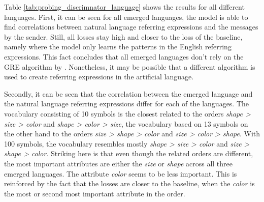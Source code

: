 Table \ref{tab:probing_discrimnator_language} shows the results for all different languages.
First, it can be seen for all emerged languages, the model is able to find correlations between natural language referring expressions and the messages by the sender.
Still, all losses stay high and closer to the loss of the baseline, namely where the model only learns the patterns in the English referring expressions.
This fact concludes that all emerged languages don't rely on the GRE algorithm by \citet{Dale1995}.
Nonetheless, it may be possible that a different algorithm is used to create referring expressions in the artificial language.

Secondly, it can be seen that the correlation between the emerged language and the natural language referring expressions differ for each of the languages.
The vocabulary consisting of 10 symbols is the closest related to the orders \emph{shape > size > color} and \emph{shape > color > size}, the vocabulary based on 13 symbols on the other hand to the orders \emph{size > shape > color} and \emph{size > color > shape}.
With 100 symbols, the vocabulary resembles mostly \emph{shape > size > color} and \emph{size > shape > color}.
Striking here is that even though the related orders are different, the most important attributes are either the \emph{size} or \emph{shape} across all three emerged languages.
The attribute \emph{color} seems to be less important.
This is reinforced by the fact that the losses are closer to the baseline, when the \emph{color} is the most or second most important attribute in the order.
